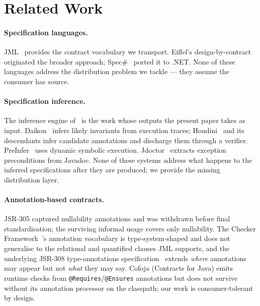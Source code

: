 \section{Related Work}
\label{sec:related}

\paragraph{Specification languages.}
JML~\cite{jml,leavens2006design} provides the contract vocabulary we transport. Eiffel's design-by-contract~\cite{meyer1992design} originated the broader approach; Spec\#~\cite{barnett2005weakest} ported it to .NET. None of these languages address the distribution problem we tackle --- they assume the consumer has source.

\paragraph{Specification inference.}
The inference engine of~\cite{edmonds2026inference} is the work whose outputs the present paper takes as input. Daikon~\cite{ernst2007daikon} infers likely invariants from execution traces; Houdini~\cite{flanagan2001houdini} and its descendants infer candidate annotations and discharge them through a verifier. PreInfer~\cite{preinfer2017} uses dynamic symbolic execution. Jdoctor~\cite{jdoctor2018} extracts exception preconditions from Javadoc. None of these systems address what happens to the inferred specifications after they are produced; we provide the missing distribution layer.

\paragraph{Annotation-based contracts.}
JSR-305 captured nullability annotations and was withdrawn before final standardisation; the surviving informal usage covers only nullability. The Checker Framework~\cite{papi2008practical}'s annotation vocabulary is type-system-shaped and does not generalise to the relational and quantified clauses JML supports, and the underlying JSR-308 type-annotations specification~\cite{ernst2017checker} extends \emph{where} annotations may appear but not \emph{what} they may say. Cofoja (Contracts for Java) emits runtime checks from \texttt{@Requires}/\texttt{@Ensures} annotations but does not survive without its annotation processor on the classpath; our work is consumer-tolerant by design.

